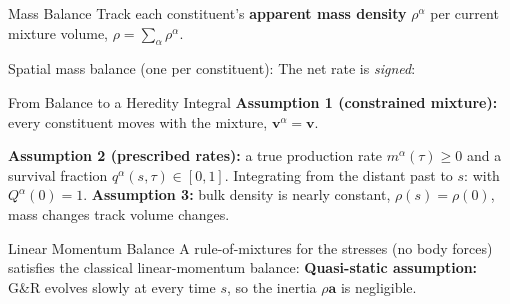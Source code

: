 \begin{frame}[t]{Mass Balance}
  Track each constituent's
  \textbf{apparent mass density} $\rho^{\alpha}$ per current
  mixture volume, $\rho=\sum_{\alpha}\rho^{\alpha}$.
  \par\medskip
  Spatial mass balance (one per constituent):
  The net rate is \emph{signed}:
\end{frame}

\begin{frame}[t]{From Balance to a Heredity Integral}
  \textbf{Assumption 1 (constrained mixture):} every constituent moves with the
  mixture, $\bm{v}^{\alpha}=\bm{v}$.
  \par\smallskip
  \textbf{Assumption 2 (prescribed rates):} a true production rate
  $m^{\alpha}(\tau)\ge 0$ and a survival fraction $q^{\alpha}(s,\tau)\in[0,1]$.
  Integrating from the distant past to $s$:
  with $Q^{\alpha}(0)=1$. \textbf{Assumption 3:} bulk density is nearly constant,
  $\rho(s)=\rho(0)$, mass changes track volume changes.
\end{frame}

\begin{frame}[t]{Linear Momentum Balance}
  A rule-of-mixtures for the stresses (no body forces) satisfies the classical
  linear-momentum balance:
  \textbf{Quasi-static assumption:} G\&R evolves slowly at every time $s$, so the
  inertia $\rho\bm{a}$ is negligible.
\end{frame}

